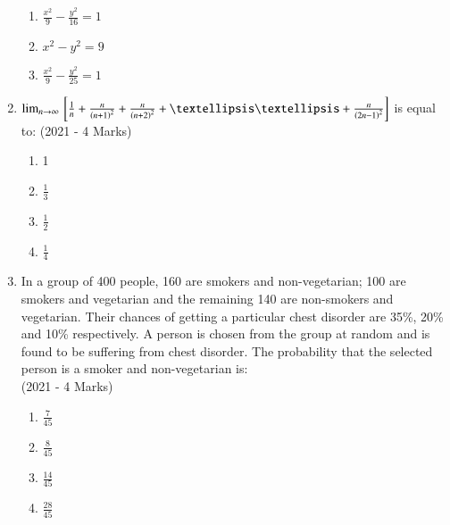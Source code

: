 \documentclass[journal]{IEEEtran}
\begin{document}
\begin{enumerate}
{\begin{multicols}{2}
\begin{enumerate}
                    \item $\frac{x^2}{9} - \frac{y^2}{16} = 1$
                    
                    \item $x^2 - y^2 = 9$
                    
                    \item $\frac{x^2}{9} - \frac{y^2}{25} = 1$
                \end{enumerate}
            \end{multicols}

        
        }
    \item{
            $\lim_{n \rightarrow \infty}\sbrak{\frac{1}{n} + \frac{n}{\brak{n+1}^2} + \frac{n}{\brak{n+2}^2} +……+ \frac{n}{\brak{2n-1}^2}}$ is equal to: 
             \hfill
                {(2021 - 4 Marks)}
            \begin{multicols}{4}
                \begin{enumerate}
                	\item 1
                	\item $\frac{1}{3}$
                	\item $\frac{1}{2}$
                	\item $\frac{1}{4}$
                \end{enumerate}
            \end{multicols}
        
        }
    \item{
            In a group of 400 people, 160 are smokers and non-vegetarian; 100 are smokers and vegetarian and the remaining 140 are non-smokers and vegetarian. Their chances of getting a particular chest disorder are 35\%, 20\% and 10\% respectively. A person is chosen from the group at random and is found to be suffering from chest disorder. The probability that the selected person is a smoker and non-vegetarian is: \\ \text{ }
             \hfill
                {(2021 - 4 Marks)}
			\begin{multicols}{4}
				\begin{enumerate}
					\item $\frac{7}{45}$  
					\item $\frac{8}{45}$  
					\item $\frac{14}{45}$  
					\item $\frac{28}{45}$
				\end{enumerate}
			\end{multicols}
        
}
\end{enumerate}
\end{document}
